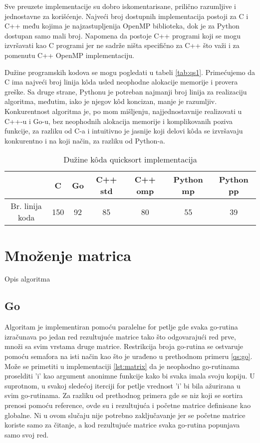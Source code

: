 \documentclass[12pt,oneside]{memoir}
\begin{document}
Sve preuzete implementacije su dobro iskomentarisane, prilično razumljive i jednostavne za korišćenje. Najveći broj dostupnih implementacija postoji za C i C++ među kojima je najzastupljenija OpenMP biblioteka, dok je za Python dostupan samo mali broj. Napomena da postoje C++ programi koji se mogu izvršavati kao C programi jer ne sadrže ništa specifično za C++ što važi i za pomenutu C++ OpenMP implementaciju.

Dužine programskih kodova se mogu pogledati u tabeli \ref{tab:qs1}. Primećujemo da C ima najveći broj linija k\^{o}da usled neophodne alokacije memorije i provera greške. Sa druge strane, Pythonu je potreban najmanji broj linija za realizaciju algoritma, međutim, iako je njegov k\^{o}d koncizan, manje je razumljiv. Konkurentnost algoritma je, po mom mišljenju, najjednostavnije realizovati u C++-u i Go-u, bez neophodnih alokacija memorije i komplikovanih poziva funkcije, za razliku od C-a i intuitivno je jasnije koji delovi k\^{o}da se izvršavaju konkurentno i na koji način, za razliku od Python-a.

\begin{table}
\begin{center}
\caption{Dužine k\^{o}da quicksort implementacija}
\begin{tabular}{|c|c|c|c|c|c|c|}
\hline
		&  C 	& Go	& C++ std	& C++ omp	& Python mp & Python pp \\ \hline
Br. linija koda& 150	& 92	&85		&80		&55		&39	 \\ \hline
\end{tabular}
\label{tab:qs2}
\end{center}
\end{table}


\section{Množenje matrica}
Opis algoritma

\subsection{Go}
Algoritam je implementiran pomoću paralelne for petlje gde svaka go-rutina izračunava po jedan red rezultujuće matrice tako što odgovarajući red prve, množi sa svim vrstama druge matrice. Restrikcija broja go-rutina se ostvaruje pomoću semafora na isti način kao što je urađeno u prethodnom primeru \ref{qs:go}. Može se primetiti u implementaciji \ref{lst:matrix} da je neophodno go-rutinama  proselditi 'i' kao argument anonimne funkcije kako bi svaka imala svoju kopiju. U suprotnom, u svakoj sledećoj iterciji for petlje vrednost 'i' bi bila ažurirana u svim go-rutinama. Za razliku od prethodnog primera gde se niz koji se sortira prenosi pomoću reference, ovde su i rezultujuća i početne matrice definisane kao globalne. Ni u ovom slučaju nije potrebno zaključavanje jer se početne matrice koriste samo za čitanje, a kod rezultujuće matrice svaka go-rutina popunjava samo svoj red. 
\end{document}
